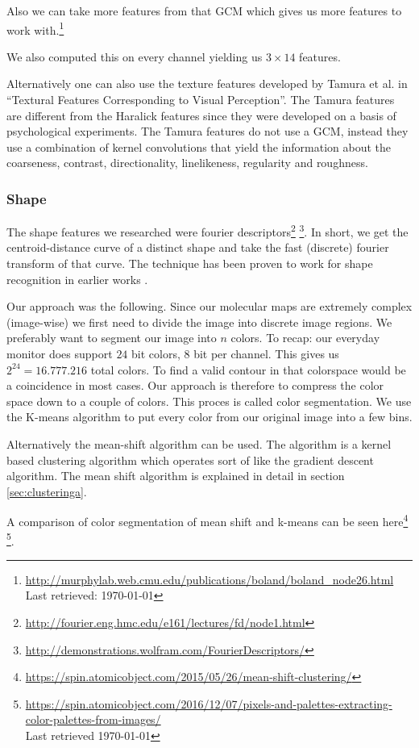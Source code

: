 \documentclass[journal]{vgtc}       %
\begin{document}
Also we can take more features from that GCM which gives us more features to work with.\footnote{\url{http://murphylab.web.cmu.edu/publications/boland/boland_node26.html} \\ Last retrieved: \today}

We also computed this on every channel yielding us \(3 \times 14 \) features.

Alternatively one can also use the  texture features developed by Tamura et al.  in ``Textural Features Corresponding to Visual Perception''\cite{tamura}. The Tamura features are different from the Haralick features since they were developed on a basis of psychological experiments. The Tamura features do not use a GCM, instead they use a combination of kernel convolutions that yield  the information about the coarseness, contrast, directionality, linelikeness, regularity and roughness.

\subsubsection{Shape}

The shape features we researched were  fourier descriptors\footnote{\url{http://fourier.eng.hmc.edu/e161/lectures/fd/node1.html} } \footnote{\url{http://demonstrations.wolfram.com/FourierDescriptors/}}. In short, we get the centroid-distance curve of a distinct shape and take the fast (discrete) fourier transform of that curve. The technique has been proven to work for shape recognition  in earlier works \cite{fourierd}.  

Our approach was the following.  Since our molecular maps are extremely complex (image-wise) we first need to divide the image into discrete image regions.  We preferably want to segment our image into $n$ colors. To recap: our everyday monitor does support \(24\) bit colors, \(8 \) bit per channel. This gives us \(2^{24}=16.777.216 \) total colors.
To find a valid contour in that colorspace would be a coincidence in most cases.
Our approach is therefore to compress the color space down to a couple of colors.
This proces is called color segmentation. We use the K-means algorithm to put every color from our original image into a few bins.

Alternatively the mean-shift algorithm can be used. The algorithm is a kernel based clustering algorithm which operates sort of like the gradient descent algorithm. The mean shift algorithm is explained in detail in section \ref{sec:clusteringa}.

A comparison of color segmentation of mean shift and  k-means can be seen here\footnote{\url{https://spin.atomicobject.com/2015/05/26/mean-shift-clustering/}} 
\footnote{\url{https://spin.atomicobject.com/2016/12/07/pixels-and-palettes-extracting-color-palettes-from-images/} \\ Last retrieved \today}. 
\end{document}
